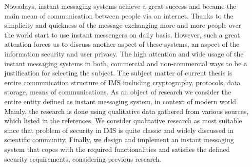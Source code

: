 
Nowadays, instant messaging systems achieve a great success and became the main mean of communication
between people via an internet.
Thanks to the simplicity and quickness of the message exchanging more and more people over the world start to use
instant messengers on daily basis.
However, such a great attention forces us to discuss another aspect of these systems, an aspect of the
information security and user privacy.
The high attention and wide usage of the instant messaging systems in both, commercial and non-commercial ways to be
a justification for selecting the subject.
The subject matter of current thesis is entire communication structure of IMS including cryptography, protocols,
data storage, means of communications.
As an object of research we consider the entire entity defined as instant messaging system, in context of modern world.
Mainly, the research is done using qualitative data gathered from various sources, which listed in the references.
We consider qualitative research as most suitable since that problem of security in IMS is quite classic and widely
discussed in scientific community.
Finally, we design and implement an instant messaging system that copes with the required functionalities and satisfies
the defined security requirements, considering previous research.